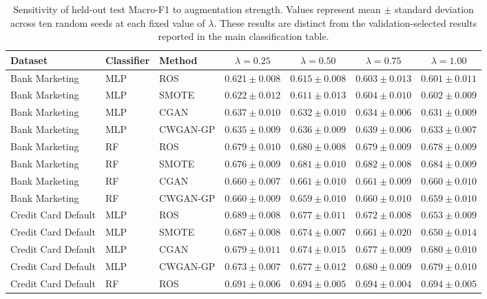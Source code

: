 \begin{table}[htbp]
\centering
\caption{Sensitivity of held-out test Macro-F1 to augmentation strength. Values represent mean $\pm$ standard deviation across ten random seeds at each fixed value of $\lambda$. These results are distinct from the validation-selected results reported in the main classification table.}
\label{tab:supp_augmentation_sensitivity}
\small
\begin{adjustbox}{max width=\textwidth}
\begin{tabular}{lllcccc}
\toprule
Dataset & Classifier & Method & $\lambda=0.25$ & $\lambda=0.50$ & $\lambda=0.75$ & $\lambda=1.00$ \\
\midrule
Bank Marketing & MLP & ROS & $0.621\pm0.008$ & $0.615\pm0.008$ & $0.603\pm0.013$ & $0.601\pm0.011$ \\
Bank Marketing & MLP & SMOTE & $0.622\pm0.012$ & $0.611\pm0.013$ & $0.604\pm0.010$ & $0.602\pm0.009$ \\
Bank Marketing & MLP & CGAN & $0.637\pm0.010$ & $0.632\pm0.010$ & $0.634\pm0.006$ & $0.631\pm0.009$ \\
Bank Marketing & MLP & CWGAN-GP & $0.635\pm0.009$ & $0.636\pm0.009$ & $0.639\pm0.006$ & $0.633\pm0.007$ \\
Bank Marketing & RF & ROS & $0.679\pm0.010$ & $0.680\pm0.008$ & $0.679\pm0.009$ & $0.678\pm0.009$ \\
Bank Marketing & RF & SMOTE & $0.676\pm0.009$ & $0.681\pm0.010$ & $0.682\pm0.008$ & $0.684\pm0.009$ \\
Bank Marketing & RF & CGAN & $0.660\pm0.007$ & $0.661\pm0.010$ & $0.661\pm0.009$ & $0.660\pm0.010$ \\
Bank Marketing & RF & CWGAN-GP & $0.660\pm0.009$ & $0.659\pm0.010$ & $0.660\pm0.010$ & $0.659\pm0.010$ \\
\midrule
Credit Card Default & MLP & ROS & $0.689\pm0.008$ & $0.677\pm0.011$ & $0.672\pm0.008$ & $0.653\pm0.009$ \\
Credit Card Default & MLP & SMOTE & $0.687\pm0.008$ & $0.674\pm0.007$ & $0.661\pm0.020$ & $0.650\pm0.014$ \\
Credit Card Default & MLP & CGAN & $0.679\pm0.011$ & $0.674\pm0.015$ & $0.677\pm0.009$ & $0.680\pm0.010$ \\
Credit Card Default & MLP & CWGAN-GP & $0.673\pm0.007$ & $0.677\pm0.012$ & $0.680\pm0.009$ & $0.679\pm0.010$ \\
Credit Card Default & RF & ROS & $0.691\pm0.006$ & $0.694\pm0.005$ & $0.694\pm0.004$ & $0.694\pm0.005$ \\

\end{tabular}
\end{adjustbox}
\end{table}
